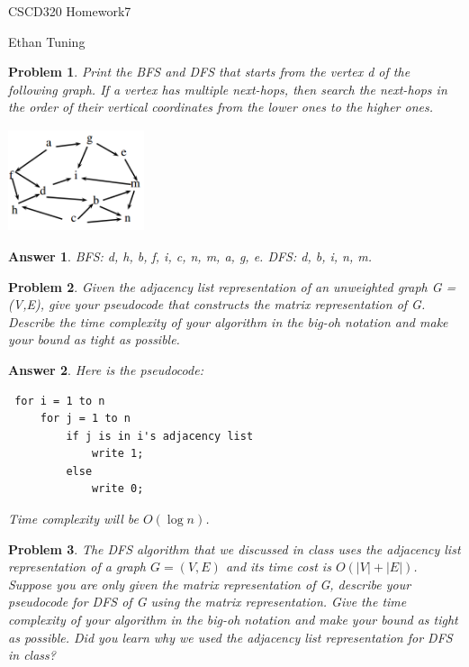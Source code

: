 \documentclass[11pt]{article}
\newtheorem{problem}{Problem}
\newtheorem{answer}{Answer}
\begin{document}
\begin{center}
	{\LARGE CSCD320 Homework7}
	
	\bigskip
	
	{\Large Ethan Tuning}
\end{center}

\bigskip

\begin{problem}
 \label{prob:1}
 Print the BFS and DFS that starts from the vertex d of the following graph. If a vertex has multiple next-hops, then search the next-hops in the order of their vertical coordinates from the lower ones to the higher ones.
\begin{center}
\includegraphics[width=4cm, height=3cm]{graph1}
\end{center}
\end{problem}

\begin{answer}
\label{ans:1}
BFS: d, h, b, f, i, c, n, m, a, g, e. DFS: d, b, i, n, m.
\end{answer}

\bigskip

\begin{problem}
 \label{prob:2}
 Given the adjacency list representation of an unweighted graph G = (V,E), give your pseudocode that constructs the matrix representation of G. Describe the time complexity of your algorithm in the big-oh notation and make your bound as tight as possible.
\end{problem}

\begin{answer}
 \label{ans:2}
 Here is the pseudocode:
\begin{center}
\begin{lstlisting}
 for i = 1 to n
	 for j = 1 to n
		 if j is in i's adjacency list
			 write 1;
		 else
			 write 0;
\end{lstlisting}
\end{center}
 Time complexity will be $O(\log{n})$.
\end{answer}

\bigskip

\begin{problem}
 \label{prob:3}
 The DFS algorithm that we discussed in class uses the adjacency list representation
 of a graph $G = (V,E)$ and its time cost is $O(|V | + |E|)$. Suppose you are only given the matrix representation of G, describe your pseudocode for DFS of G using the matrix representation. Give the time complexity of your algorithm in the big-oh notation and make your bound as tight as possible. Did you learn why we used the adjacency list representation for DFS in class?
\end{problem}
\end{document}
